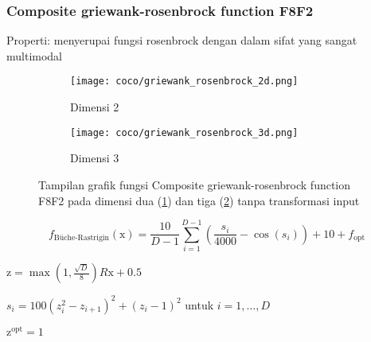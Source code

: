 \subsubsection*{Composite griewank-rosenbrock function F8F2}
\noindent Properti:
menyerupai fungsi rosenbrock dengan dalam sifat yang sangat multimodal
\begin{figure}[H]
	\centering
	\begin{subfigure}[b]{0.4\textwidth}
		\centering
		\texttt{[image: coco/griewank\_rosenbrock\_2d.png]}
		\caption{Dimensi 2}
		\label{fig:griewank-rosenbrock-2d}
	\end{subfigure}
	\hfill
	\begin{subfigure}[b]{0.4\textwidth}
		\centering
		\texttt{[image: coco/griewank\_rosenbrock\_3d.png]}
		\caption{Dimensi 3}
		\label{fig:griewank-rosenbrock-3d}
	\end{subfigure}
	\caption{Tampilan grafik fungsi Composite griewank-rosenbrock function F8F2 pada dimensi dua (\cref{fig:griewank-rosenbrock-2d}) dan tiga (\cref{fig:griewank-rosenbrock-3d}) tanpa transformasi input}
	\label{fig:griewank_rosenbrock}
\end{figure}
\begin{equation}
  f_{\text{Büche-Rastrigin}}(\mathrm{x})=\frac{10}{D-1}\sum_{i=1}^{D-1}(\frac{s_i}{4000}-\cos(s_i))+10+f_{\text{opt}}
\end{equation}
\begin{packed_item}
    \item $\mathrm{z}=\max(1,\frac{\sqrt{D}}{8})R\mathrm{x}+0.5$
    \item $s_i=100(z_i^2-z_{i+1})^2+(z_i-1)^2$ untuk $i=1,\ldots,D$
    \item $\mathrm{z}^{\text{opt}}=1$
\end{packed_item}

